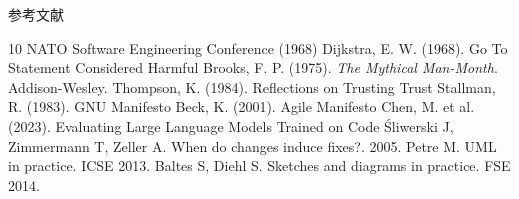 \documentclass{beamer}
\begin{document}
\begin{frame}[t]{参考文献}
\begin{thebibliography}{10}
\tiny
{} NATO Software Engineering Conference (1968)
 Dijkstra, E. W. (1968). Go To Statement Considered Harmful
 Brooks, F. P. (1975). \textit{The Mythical Man-Month}. Addison-Wesley. 
 Thompson, K. (1984). Reflections on Trusting Trust
 Stallman, R. (1983). GNU Manifesto
 Beck, K. (2001). Agile Manifesto
 Chen, M. et al. (2023). Evaluating Large Language Models Trained on Code
 Śliwerski J, Zimmermann T, Zeller A. When do changes induce fixes?. 2005.
 Petre M. UML in practice. ICSE 2013.
 Baltes S, Diehl S. Sketches and diagrams in practice. FSE 2014.
\end{thebibliography}
\end{frame}
\end{document}
